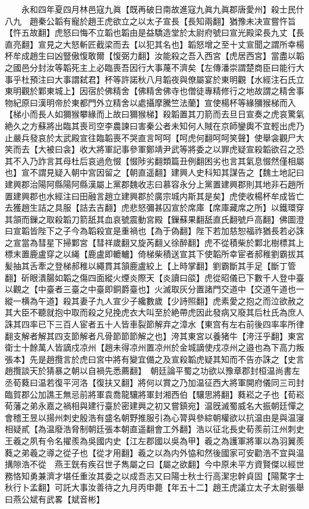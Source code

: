　　永和四年夏四月林邑寇九眞【既再破日南故進寇九眞九眞郡唐愛州】殺士民什八九　趙秦公韜有寵於趙王虎欲立之以太子宣長【長知兩翻】猶豫未决宣嘗忤旨【忤五故翻】虎怒曰悔不立韜也韜由是益驕造堂於太尉府號曰宣光殿梁長九丈【長直亮翻】宣見之大怒斬匠截梁而去【以犯其名也】韜怒增之至十丈宣聞之謂所幸楊杯牟成趙生曰凶豎傲愎敢爾【愎弼力翻】汝能殺之吾入西宮【虎居西宮】當盡以韜之國邑分封汝等韜死主上必臨喪吾因行大事蔑不濟矣【左傳潘崇謂楚商臣曰能行大事乎杜預注曰大事謂弑君】杯等許諾秋八月韜夜與僚屬宴於東明觀【水經注石氏立東明觀於鄴東城上】因宿於佛精舍【佛精舍佛寺也僧徒專精修行之地故謂之精舍事物紀原曰漢明帝於東都門外立精舍以處攝摩騰竺法蘭】宣使楊杯等緣獼猴梯而入【梯小而長人如獮猴攀緣而上故曰獮猴梯】殺韜置其刀箭而去旦日宣奏之虎哀驚氣絶久之方蘇將出臨其喪司空李農諫曰害秦公者未知何人賊在京師鑾輿不宜輕出虎乃止嚴兵發哀於太武殿宣往臨韜喪不哭直言呵呵【呵虎何翻呵呵笑聲】使舉衾觀尸大笑而去【大被曰衾】收大將軍記事參軍鄭靖尹武等將委之以罪虎疑宣殺韜欲召之恐其不入乃詐言其母杜后哀過危惙【惙陟劣翻類篇丑例翻困劣也言其氣息惙然僅相屬也】宣不謂見疑入朝中宮因留之【朝直遥翻】建興人史科知其謀告之【魏土地記曰建興郡治陽阿縣陽阿縣漢屬上黨郡魏收志曰慕容永分上黨置建興郡則其地非石趙所置建興郡也水經注曰田融言趙立建興郡於廣宗城内斯其是矣】虎使收楊杯牟成皆亡去獲趙生詰之具服【詰去吉翻】虎悲怒彌甚囚宣於席庫【席庫藏席之所】以鐵環穿其頷而鏁之取殺韜刀箭舐其血哀號震動宮殿【鏁蘇果翻舐直氏翻號戶高翻】佛圖澄曰宣韜皆陛下之子今為韜殺宣是重禍也【為于偽翻】陛下若加慈恕福祚猶長若必誅之宣當為彗星下掃鄴宮【彗祥歲翻又旋芮翻乂徐醉翻】虎不從積柴於鄴北樹標其上標末置鹿盧穿之以䋲【鹿盧即轆轤】倚梯柴積送宣其下使韜所幸宦者郝稚劉霸拔其髪抽其舌牽之登梯郝稚以繩貫其頷鹿盧絞上【上時掌翻】劉霸斷其手足【斷丁管翻】斫眼潰腸如韜之傷四面縱火煙炎際天【炎讀曰燄】虎從昭儀已下數千人登中臺以觀之【中臺者三臺之中臺即銅爵臺也】火滅取灰分置諸門交道中【交道午道也一縱一横為午道】殺其妻子九人宣少子纔數歲【少詩照翻】虎素愛之抱之而泣欲赦之其大臣不聽就抱中取而殺之兒挽虎衣大叫至於絶帶虎因此發病又廢其后杜氏為庶人誅其四率已下三百人宦者五十人皆車裂節解弃之漳水【東宫有左右前後四率率所律翻支解者解其四支節解者凡骨節節節解之也】洿其東宮以養猪牛【洿汪乎翻】東宮衛士十餘萬人皆謫戍凉州【趙未得凉州置凉州於金城謫使戍凉州之邉也為下高力叛張本】先是趙攬言於虎曰宮中將有變宜備之及宣殺韜虎疑其知而不告亦誅之【史言趙攬談天於猜暴之朝以自禍先悉薦翻】　朝廷論平蜀之功欲以豫章郡封桓温尚書左丞荀蕤曰温若復平河洛【復扶又翻】將何以賞之乃加温征西大將軍開府儀同三司封臨賀郡公加譙王無忌前將軍袁喬龍驤將軍封湘西伯【驤思將翻】蕤崧之子也【荀崧荀藩之弟永嘉之禍相與建行臺於密建興之初又嘗鎮宛】温旣滅蜀威名大振朝廷憚之會稽王昱以揚州刺史殷浩有盛名朝野推服引為心膂與參綜朝權欲以抗温由是與温寖相疑貳【為温廢浩脅制朝廷張本朝直遥翻會工外翻】浩以征北長史荀羨前江州刺史王羲之夙有令名擢羨為吳國内史【江左郡國以吳為甲】羲之為護軍將軍以為羽翼羨蕤之弟羲之導之從子也【從才用翻】羲之以為内外恊和然後國家可安勸浩不宜與温搆隙浩不從　燕王皝有疾召世子雋屬之曰【屬之欲翻】今中原未平方資賢傑以經世務恪知勇兼濟才堪任重汝其委之以成吾志又曰陽士秋士行高潔忠幹貞固【陽騖字士秋行卜孟翻】可託大事汝善待之九月丙申薨【年五十二】趙王虎議立太子太尉張舉曰燕公斌有武畧【斌音彬】

